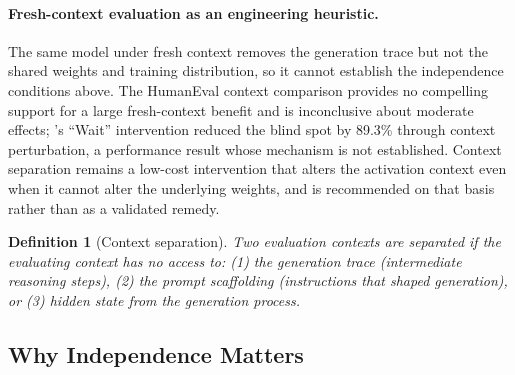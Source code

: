 \documentclass[a4paper,journal]{IAENGtran}
\newtheorem{Definition}[Theorem]{Definition}
\begin{document}
\paragraph{Fresh-context evaluation as an engineering heuristic.} The same model under
fresh context removes the generation trace but not the shared weights and training
distribution, so it cannot establish the independence conditions above. The HumanEval
context comparison provides no compelling support for a large fresh-context benefit
and is inconclusive about moderate effects; \cite{tsui2025selfcorrection}'s ``Wait''
intervention reduced the blind spot by 89.3\% through context perturbation, a
performance result whose mechanism is not established. Context separation remains a
low-cost intervention that alters the activation context even when it cannot alter the
underlying weights, and is recommended on that basis rather than as a validated remedy.

\begin{Definition}[Context separation]
\label{def:context_sep}
Two evaluation contexts are \emph{separated} if the evaluating context has no access to:
(1) the generation trace (intermediate reasoning steps), (2) the prompt scaffolding
(instructions that shaped generation), or (3) hidden state from the generation process.
\end{Definition}

\subsection{Why Independence Matters}
\end{document}
